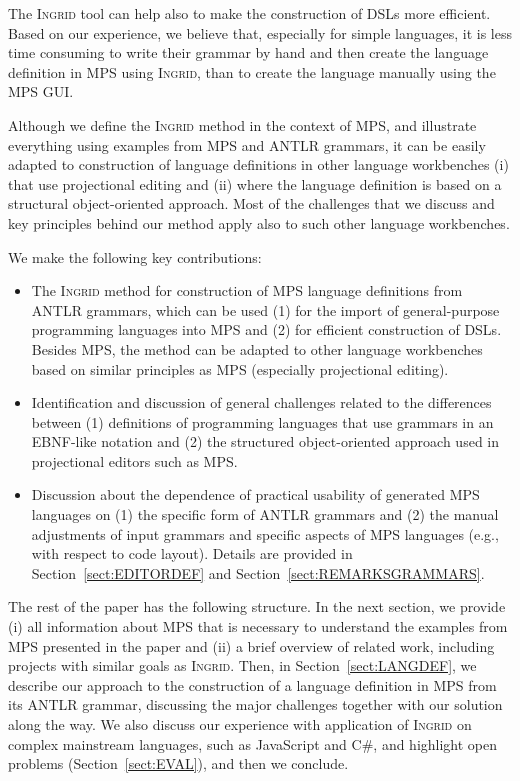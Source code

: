 The \textsc{Ingrid} tool can help also to make the construction of DSLs more efficient.
Based on our experience, we believe that, especially for simple languages, it is less time consuming to write their grammar by hand and then create the language definition in MPS using \textsc{Ingrid}, than to create the language manually using the MPS GUI.


Although we define the \textsc{Ingrid} method in the context of MPS, and illustrate everything using examples from MPS and ANTLR grammars, it can be easily adapted to construction of language definitions in other language workbenches (i) that use projectional editing and (ii) where the language definition is based on a structural object-oriented approach.
Most of the challenges that we discuss and key principles behind our method apply also to such other language workbenches.

We make the following key contributions:
\begin{itemize}
	\item The \textsc{Ingrid} method for construction of MPS language definitions from ANTLR grammars, which can be used (1) for the import of general-purpose programming languages into MPS and (2) for efficient construction of DSLs. Besides MPS, the method can be adapted to other language workbenches based on similar principles as MPS (especially projectional editing).
	\item Identification and discussion of general challenges related to the differences between (1) definitions of programming languages that use grammars in an EBNF-like notation and (2) the structured object-oriented approach used in projectional editors such as MPS.
	\item Discussion about the dependence of practical usability of generated MPS languages on (1) the specific form of ANTLR grammars and (2) the manual adjustments of input grammars and specific aspects of MPS languages (e.g., with respect to code layout). Details are provided in Section~\ref{sect:EDITORDEF} and Section~\ref{sect:REMARKSGRAMMARS}.
\end{itemize}

The rest of the paper has the following structure.
In the next section, we provide (i) all information about MPS that is necessary to understand the examples from MPS presented in the paper and (ii) a brief overview of related work, including projects with similar goals as \textsc{Ingrid}.
Then, in Section~\ref{sect:LANGDEF}, we describe our approach to the construction of a language definition in MPS from its ANTLR grammar, discussing the major challenges together with our solution along the way.
We also discuss our experience with application of \textsc{Ingrid} on complex mainstream languages, such as JavaScript and C\#, and highlight open problems (Section~\ref{sect:EVAL}), and then we conclude.

